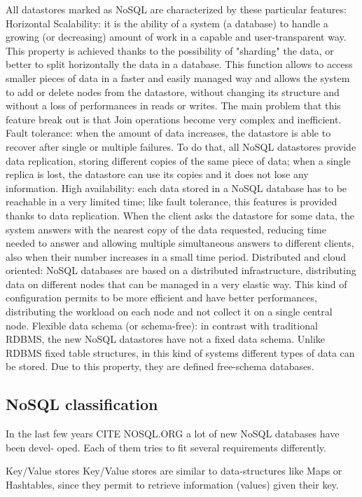 All datastores marked as NoSQL are characterized by these particular features:
Horizontal Scalability: it is the ability of a system (a database) to handle a growing (or decreasing) amount of work in a capable and user-transparent way. This property is achieved thanks to the possibility of "sharding" the data, or better to split horizontally the data in a database. This function allows to access smaller pieces of data in a faster and easily managed way and allows the system to add or delete nodes from the datastore, without changing its structure and without a loss of performances in reads or writes. The main problem that this feature break out is that Join operations become very complex and inefficient.
Fault tolerance: when the amount of data increases, the datastore is able to recover after single or multiple failures. To do that, all NoSQL datastores provide data replication, storing different copies of the same piece of data; when a single replica is lost, the datastore can use its copies and it does not lose any information.
High availability: each data stored in a NoSQL database has to be reachable in a very limited time; like fault tolerance, this features is provided thanks to data replication. When the client asks the datastore for some data, the system answers with the nearest copy of the data requested, reducing time needed to answer and allowing multiple simultaneous answers to different clients, also when their number increases in a small time period.
Distributed and cloud oriented: NoSQL databases are based on a distributed infrastructure, distributing data on different nodes that can be managed in a very elastic way.
This kind of configuration permits to be more efficient and have better performances, distributing the workload on each node and not collect it on a single central node.
Flexible data schema (or schema-free): in contrast with traditional
RDBMS, the new NoSQL datastores have not a fixed data schema.
Unlike RDBMS fixed table structures, in this kind of systems different types of data can be stored. Due to this property, they are defined free-schema databases.

\subsection{NoSQL classification}
In the last few years CITE NOSQL.ORG a lot of new NoSQL databases have been devel- oped. Each of them tries to fit several requirements differently. 

Key/Value stores Key/Value stores are similar to data-structures like Maps or Hashtables, since they permit to retrieve information (values) given their key.

